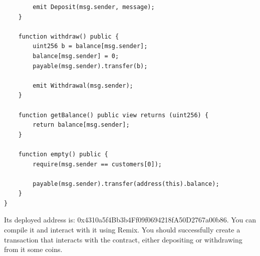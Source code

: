 \documentclass[12pt,addpoints,answers]{exam}
\begin{document}
\begin{questions}
{\begin{verbatim}
        emit Deposit(msg.sender, message);
    }

    function withdraw() public {
        uint256 b = balance[msg.sender];
        balance[msg.sender] = 0;
        payable(msg.sender).transfer(b);

        emit Withdrawal(msg.sender);
    }

    function getBalance() public view returns (uint256) {
        return balance[msg.sender];
    }
    
    function empty() public {
        require(msg.sender == customers[0]);
        
        payable(msg.sender).transfer(address(this).balance);
    }
}
\end{verbatim}

} %

 Its deployed address is: 0x4310a5f4Bb3b4Ff09f0694218fA50D2767a00b86. You can compile it and interact with it using Remix. You should successfully create a transaction that interacts with the contract, either depositing or withdrawing from it some coins. 
 

\newpage


\end{questions}
\end{document}

